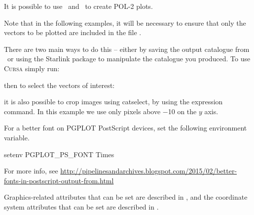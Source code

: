 It is possible to use \Kappa\ and \polpack\ to create POL-2 plots.

\begin{terminalv}
\end{terminalv}

Note that in the following examples, it will be necessary to ensure
that only the vectors to be plotted are included in the file
.

There are two main ways to do this -- either by saving the output
catalogue from \GAIA\ or using the Starlink package
 to manipulate
the catalogue you produced.  To use \textsc{Cursa} simply run:

\begin{terminalv}
\end{terminalv}

then to select the vectors of interest:

\begin{terminalv}
\end{terminalv}

it is also possible to crop images using catselect, by using the
expression command.  In this example we use only pixels above $-$10 on
the $y$ axis.

\begin{terminalv}
\end{terminalv}




\begin{tip}
  For a better font on PGPLOT PostScript devices, set the following
  environment variable.

\begin{terminalv}
setenv PGPLOT_PS_FONT Times
\end{terminalv}

For more info, see
\url{http://pipelinesandarchives.blogspot.com/2015/02/better-fonts-in-postscript-output-from.html}

Graphics-related attributes that can be set are described in
, and the coordinate system attributes that can be set are
described in .
\end{tip}





